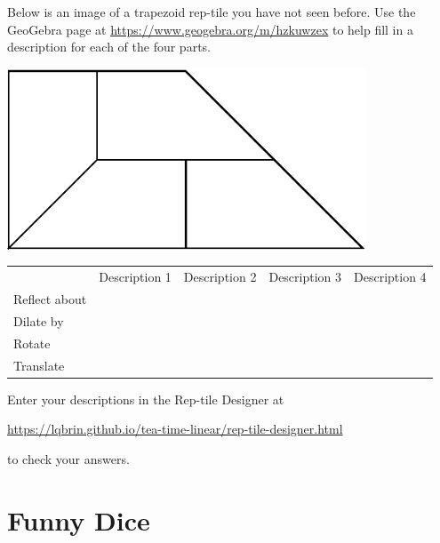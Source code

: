 Below is an image of a trapezoid rep-tile you have not seen before. Use the GeoGebra page at \hyperlink{https://www.geogebra.org/m/hzkuwzex}{https://www.geogebra.org/m/hzkuwzex} to help fill in a description for each of the four parts.
	\begin{center}
        \includegraphics[width=4.2in]{images/langford-05}
    \end{center}
			\setlength{\extrarowheight}{20pt}
			\begin{tabular}{l|c|c|c|c|}
			\multicolumn{1}{l}{} & \multicolumn{1}{c}{Description 1} & \multicolumn{1}{c}{Description 2} & \multicolumn{1}{c}{Description 3} & \multicolumn{1}{c}{Description 4}\tabularnewline
			\cline{2-5} \cline{3-5} \cline{4-5} \cline{5-5} 
			Reflect about & &  &  & \tabularnewline
			\cline{2-5} \cline{3-5} \cline{4-5} \cline{5-5} 
			Dilate by & &  &  & \tabularnewline
			\cline{2-5} \cline{3-5} \cline{4-5} \cline{5-5} 
			Rotate & &  &  & \tabularnewline
			\cline{2-5} \cline{3-5} \cline{4-5} \cline{5-5} 
			Translate &  &  &  & \tabularnewline
			\cline{2-5} \cline{3-5} \cline{4-5} \cline{5-5} 
			\end{tabular}
			\setlength{\extrarowheight}{0pt}
			
	\vspace{15pt}
	\noindent Enter your descriptions in the Rep-tile Designer at
	\begin{center}
		\hyperlink{https://lqbrin.github.io/tea-time-linear/rep-tile-designer.html}{https://lqbrin.github.io/tea-time-linear/rep-tile-designer.html}
	\end{center}
	to check your answers. 

\newpage


\section{Funny Dice}\label{sec:FunnyDice}
\wbnewpage
